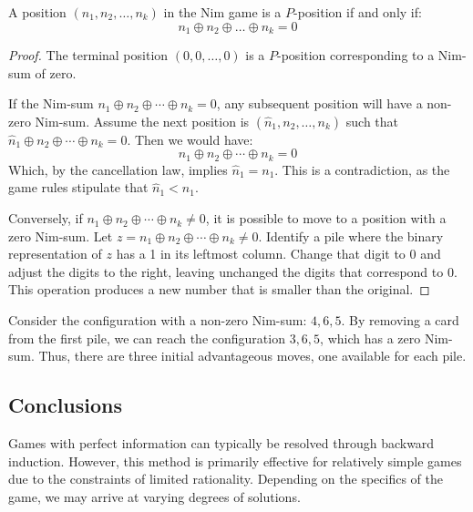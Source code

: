 \begin{theorem}[Bouton]
    A position $(n_1, n_2, \dots, n_k)$ in the Nim game is a $P$-position if and only if:
    \[n_1 \oplus n_2 \oplus \dots \oplus n_k = 0\]
\end{theorem}
\begin{proof}
    The terminal position $(0, 0, \dots , 0)$ is a $P$-position corresponding to a Nim-sum of zero.

    If the Nim-sum $n_1 \oplus n_2 \oplus \cdots \oplus n_k = 0$, any subsequent position will have a non-zero Nim-sum. 
    Assume the next position is $(\hat{n}_1, n_2, \ldots, n_k)$ such that $\hat{n}_1 \oplus n_2 \oplus \cdots \oplus n_k = 0$. 
    Then we would have:
    \[n_1 \oplus n_2 \oplus \cdots \oplus n_k = 0\]
    Which, by the cancellation law, implies $\hat{n}_1 = n_1$. 
    This is a contradiction, as the game rules stipulate that $\hat{n}_1 < n_1$.
    
    Conversely, if $n_1 \oplus n_2 \oplus \cdots \oplus n_k \neq 0$, it is possible to move to a position with a zero Nim-sum. 
    Let $z = n_1 \oplus n_2 \oplus \cdots \oplus n_k \neq 0$.
    Identify a pile where the binary representation of $z$ has a 1 in its leftmost column. 
    Change that digit to 0 and adjust the digits to the right, leaving unchanged the digits that correspond to 0. 
    This operation produces a new number that is smaller than the original. 
\end{proof}
\begin{example}
    Consider the configuration with a non-zero Nim-sum: $4,6,5$. 
    By removing a card from the first pile, we can reach the configuration $3,6,5$, which has a zero Nim-sum. 
    Thus, there are three initial advantageous moves, one available for each pile. 
\end{example}

\subsection{Conclusions}
Games with perfect information can typically be resolved through backward induction. 
However, this method is primarily effective for relatively simple games due to the constraints of limited rationality. 
Depending on the specifics of the game, we may arrive at varying degrees of solutions.